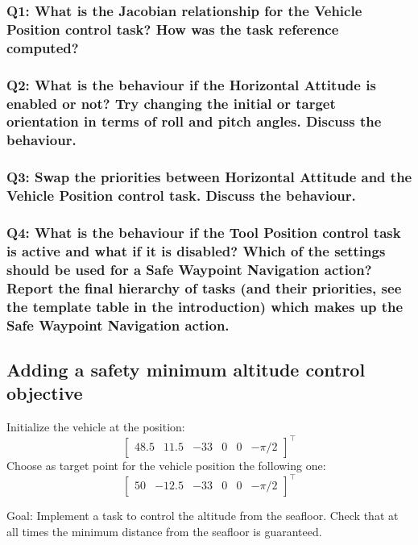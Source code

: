 \documentclass{article}
\begin{document}
\subsubsection{Q1: What is the Jacobian relationship for the Vehicle Position control task? How was the task reference computed?}


\subsubsection{Q2: What is the behaviour if the Horizontal Attitude is enabled or not? Try changing the initial or target orientation in terms of roll and pitch angles. Discuss the behaviour.}

\subsubsection{Q3: Swap the priorities between Horizontal Attitude and the Vehicle Position control task. Discuss the behaviour.}

\subsubsection{Q4: What is the behaviour if the Tool Position control task is active and what if it is disabled? Which of the settings should be used for a Safe Waypoint Navigation action? Report the final hierarchy of tasks (and their priorities, see the template table in the introduction) which makes up the Safe Waypoint Navigation action.}


\subsection{Adding a safety minimum altitude control objective}
Initialize the vehicle at the position:
\begin{displaymath}
\begin{bmatrix} 48.5 & 11.5 & -33 & 0 & 0 &-\pi/2\end{bmatrix}^\top
\end{displaymath} 
Choose as target point for the vehicle position the following one:
\begin{displaymath}
\begin{bmatrix} 50 & -12.5 & -33 & 0 & 0 & -\pi/2 \end{bmatrix}^\top
\end{displaymath}

Goal: Implement a task to control the altitude from the seafloor. Check that at all times the minimum distance from the seafloor is guaranteed.
\end{document}
